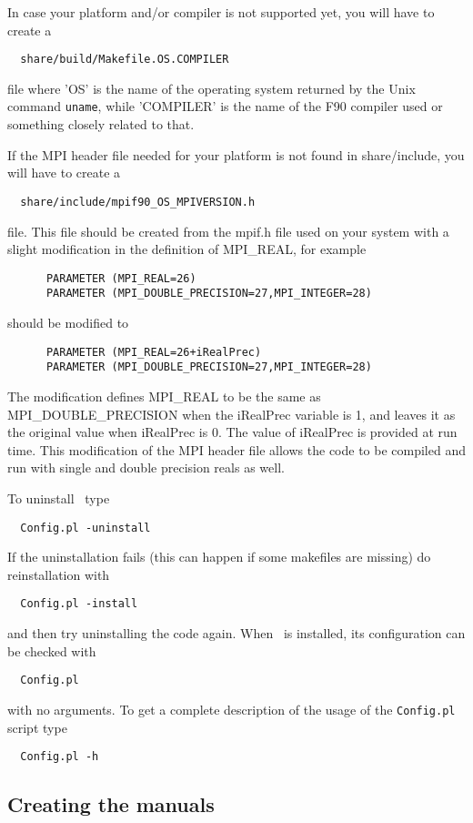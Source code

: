 In case your platform and/or compiler is not supported yet, 
you will have to create a
\begin{verbatim}
  share/build/Makefile.OS.COMPILER
\end{verbatim}
file where 'OS' is the name of the operating system returned
by the Unix command {\tt uname}, while 'COMPILER' is the name
of the F90 compiler used or something closely related to that.

If the MPI header file needed for your platform is not 
found in share/include, you will have to create a
\begin{verbatim}
  share/include/mpif90_OS_MPIVERSION.h
\end{verbatim}
file. This file should be created from the mpif.h file used on your system
with a slight modification in the definition of MPI\_REAL, for example
\begin{verbatim}
      PARAMETER (MPI_REAL=26)
      PARAMETER (MPI_DOUBLE_PRECISION=27,MPI_INTEGER=28)
\end{verbatim}
should be modified to
\begin{verbatim}
      PARAMETER (MPI_REAL=26+iRealPrec)
      PARAMETER (MPI_DOUBLE_PRECISION=27,MPI_INTEGER=28)
\end{verbatim}
The modification defines MPI\_REAL to be the same as MPI\_DOUBLE\_PRECISION
when the iRealPrec variable is 1, and leaves it as the original value
when iRealPrec is 0. The value of iRealPrec is provided at run time.
This modification of the MPI header file allows the code to be compiled 
and run with single and double precision reals as well.

To uninstall \BATSRUS\ type
\begin{verbatim}
  Config.pl -uninstall
\end{verbatim}
If the uninstallation fails (this can happen if some makefiles are missing)
do reinstallation with
\begin{verbatim}
  Config.pl -install
\end{verbatim}
and then try uninstalling the code again.
When \BATSRUS\ is installed, its configuration can be checked with
\begin{verbatim}
  Config.pl
\end{verbatim}
with no arguments. 
To get a complete description of the usage of the 
{\tt Config.pl} script type
\begin{verbatim}
  Config.pl -h
\end{verbatim}

\subsection{Creating the manuals}

